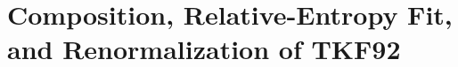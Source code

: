 
\providecommand\evolu{u}
\providecommand\ggigen{G_{\mathrm{GGI}}}
\providecommand\ggikern{\mathbb{G}}
\providecommand\compdefect{\Delta_2}
\providecommand\betafn{\mathcal{B}}
\providecommand\obskern{K}
\providecommand\dkl[2]{D\!\left(#1\,\middle\|\,#2\right)}
\providecommand\ggi{\mathrm{GGI}}
\providecommand\nfragext{F}
\providecommand\nfragend{\bar F}
\providecommand\mat{\mathtt{M}}
\providecommand\ins{\mathtt{I}}
\providecommand\del{\mathtt{D}}
\providecommand\nul{\mathtt{N}}
\providecommand\wait{\mathtt{W}}
\providecommand\sta{\mathtt{S}}
\providecommand\fin{\mathtt{E}}
\providecommand\ymx{\mathbf{y}}
\providecommand\zmx{\mathbf{z}}
\providecommand\ty[1]{y_{#1}}
\providecommand\tz[1]{z_{#1}}
\providecommand\triadstart{\mathtt{SS}}
\providecommand\stains{\mathtt{sI}}
\providecommand\matmat{\mathtt{MM}}
\providecommand\matins{\mathtt{mI}}
\providecommand\matdel{\mathtt{MD}}
\providecommand\insmat{\mathtt{IM}}
\providecommand\insins{\mathtt{iI}}
\providecommand\insdel{\mathtt{ID}}
\providecommand\delsta{\mathtt{Ds}}
\providecommand\delmat{\mathtt{Dm}}
\providecommand\delins{\mathtt{Di}}
\providecommand\deldel{\mathtt{Dd}}
\providecommand\triadend{\mathtt{EE}}
\providecommand\jointpairmatrix{\ymx}
\providecommand\condpairmatrix{\zmx}
\providecommand\jointpairhmm{\jointpairmatrix}
\providecommand\condpairhmm{\condpairmatrix}
\providecommand\toLower{\mathrm{lc}}
\providecommand\triadstates{\mathcal{S}_{\rm triad}}
\providecommand\triadalphabet{\mathcal{A}_{\rm triad}}
\providecommand\statetype{\tau}
\providecommand\fragext{\ext}

\section{Composition, Relative-Entropy Fit, and Renormalization of TKF92}
\label{sec:composition-renorm}

